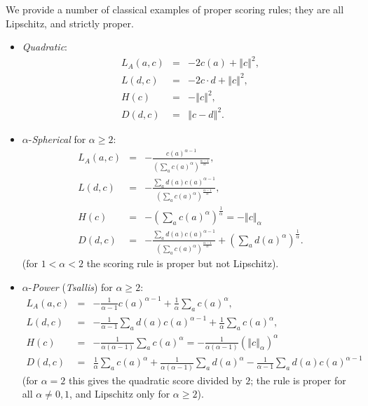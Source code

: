 \documentclass[12pt,a4paper,notitlepage]{article}
\begin{document}
We provide a number of classical examples of proper scoring rules; they are
all Lipschitz, and strictly proper.

\bigskip

\begin{itemize}
\item \emph{Quadratic}: 
\begin{eqnarray*}
L_{A}(a,c) &=&-2c(a)+\left\Vert c\right\Vert ^{2}, \\
L(d,c) &=&-2c\cdot d+\left\Vert c\right\Vert ^{2}, \\
H(c) &=&-\left\Vert c\right\Vert ^{2}, \\
D(d,c) &=&\left\Vert c-d\right\Vert ^{2}.
\end{eqnarray*}

\item $\alpha $-\emph{Spherical} for $\alpha \geq 2$: 
\begin{eqnarray*}
L_{A}(a,c) &=&-\frac{c(a)^{\alpha -1}}{\left( \sum_{a}c(a)^{\alpha }\right)
^{\frac{\alpha -1}{\alpha }}}, \\
L(d,c) &=&-\frac{\sum_{a}d(a)c(a)^{\alpha -1}}{\left( \sum_{a}c(a)^{\alpha
}\right) ^{\frac{\alpha -1}{\alpha }}}, \\
H(c) &=&-\left( \sum_{a}c(a)^{\alpha }\right) ^{\frac{1}{\alpha }%
}=-\left\Vert c\right\Vert _{\alpha } \\
D(d,c) &=&-\frac{\sum_{a}d(a)c(a)^{\alpha -1}}{\left( \sum_{a}c(a)^{\alpha
}\right) ^{\frac{\alpha -1}{\alpha }}}+\left( \sum_{a}d(a)^{\alpha }\right)
^{\frac{1}{\alpha }}.
\end{eqnarray*}%
(for $1<\alpha <2$ the scoring rule is proper but not Lipschitz).

\item $\alpha $-\emph{Power} (\emph{Tsallis}) for $\alpha \geq 2$:%
\begin{eqnarray*}
L_{A}(a,c) &=&-\frac{1}{\alpha -1}c(a)^{\alpha -1}+\frac{1}{\alpha }%
\sum_{a}c(a)^{\alpha }, \\
L(d,c) &=&-\frac{1}{\alpha -1}\sum_{a}d(a)c(a)^{\alpha -1}+\frac{1}{\alpha }%
\sum_{a}c(a)^{\alpha }, \\
H(c) &=&-\frac{1}{\alpha (\alpha -1)}\sum_{a}c(a)^{\alpha }=-\frac{1}{\alpha
(\alpha -1)}\left( \left\Vert c\right\Vert _{\alpha }\right) ^{\alpha } \\
D(d,c) &=&\frac{1}{\alpha }\sum_{a}c(a)^{\alpha }+\frac{1}{\alpha (\alpha -1)%
}\sum_{a}d(a)^{\alpha }-\frac{1}{\alpha -1}\sum_{a}d(a)c(a)^{\alpha -1}
\end{eqnarray*}%
(for $\alpha =2$ this gives the quadratic score divided by $2$; the rule is
proper for all $\alpha \neq 0,1$, and Lipschitz only for $\alpha \geq 2$).
\end{itemize}
\end{document}
